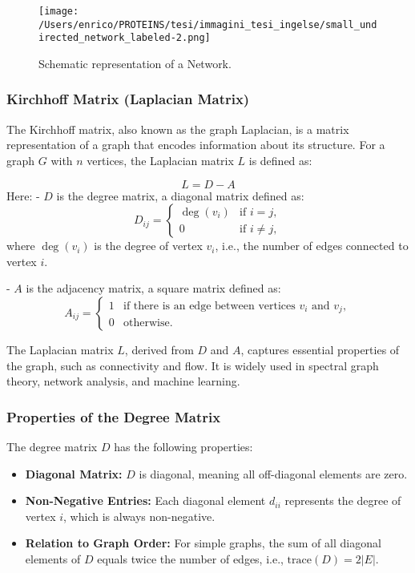 \documentclass[English, Lau, oneside]{sapthesis}
\begin{document}
\begin{figure}[h]
    \centering
    \texttt{[image: /Users/enrico/PROTEINS/tesi/immagini\_tesi\_ingelse/small\_undirected\_network\_labeled-2.png]}    
    \caption{Schematic representation of a Network.}
    \label{fig:Network}
\end{figure}

\subsubsection{Kirchhoff Matrix (Laplacian Matrix)}
\noindent The Kirchhoff matrix, also known as the graph Laplacian, is a matrix representation of a graph that encodes information about its structure. For a graph \( G \) with \( n \) vertices, the Laplacian matrix \( L \) is defined as:\cite{ref11}

\begin{equation}
    L = D - A \label{Kirchhoff}
\end{equation}
Here:
- \( D \) is the degree matrix, a diagonal matrix defined as:
\begin{equation}
    D_{ij} = 
    \begin{cases} 
      \deg(v_i) & \text{if } i = j, \\
      0 & \text{if } i \neq j,
    \end{cases}
\end{equation}
where \( \deg(v_i) \) is the degree of vertex \( v_i \), i.e., the number of edges connected to vertex \( i \).

- \( A \) is the adjacency matrix, a square matrix defined as:
\begin{equation}
    A_{ij} = 
    \begin{cases} 
      1 & \text{if there is an edge between vertices } v_i \text{ and } v_j, \\
      0 & \text{otherwise}.
    \end{cases}
\end{equation}

The Laplacian matrix \( L \), derived from \( D \) and \( A \), captures essential properties of the graph, such as connectivity and flow. It is widely used in spectral graph theory, network analysis, and machine learning.
\subsubsection{Properties of the Degree Matrix}
The degree matrix \( D \) has the following properties:\cite{ref11}
\begin{itemize}
    \item \textbf{Diagonal Matrix:} \( D \) is diagonal, meaning all off-diagonal elements are zero.
    \item \textbf{Non-Negative Entries:} Each diagonal element \( d_{ii} \) represents the degree of vertex \( i \), which is always non-negative.
    \item \textbf{Relation to Graph Order:} For simple graphs, the sum of all diagonal elements of \( D \) equals twice the number of edges, i.e., \( \mathrm{trace}(D) = 2|E| \).
\end{itemize}
\end{document}
